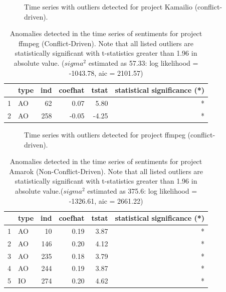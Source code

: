 \documentclass[12pt,letterpaper]{gthesis2}  %
\begin{document}
\begin{figure} [!htbp]
\centering
{}
\caption{Time series with outliers detected for project Kamailio (conflict-driven).}
\label{figureOutliers_1}
\end{figure}

\pagebreak

\begin{table} [!htbp]
\centering
\caption{Anomalies detected in the time series of sentiments for project ffmpeg (Conflict-Driven). Note that all listed outliers are statistically significant with t-statistics greater than 1.96 in absolute value. ($sigma^2$ estimated as 57.33:  log likelihood = -1043.78,  aic = 2101.57)}
\begin{tabular}{rlrrrr}
  \hline
 & type & ind & coefhat & tstat & statistical significance (*)\\ 
  \hline
1 & AO &  62 & 0.07 & 5.80 & * \\ 
  2 & AO & 258 & -0.05 & -4.25 & * \\ 
   \hline
\end{tabular}
\end{table}


\begin{figure} [!htbp]
\centering
{}
\caption{Time series with outliers detected for project ffmpeg (conflict-driven).}
\label{figureOutliers_2}
\end{figure}

\pagebreak


\begin{table} [!htbp]
\centering
\caption{Anomalies detected in the time series of sentiments for project Amarok (Non-Conflict-Driven). Note that all listed outliers are statistically significant with t-statistics greater than 1.96 in absolute value.($sigma^2$ estimated as 375.6:  log likelihood = -1326.61,  aic = 2661.22)}
\begin{tabular}{rlrrrr}
  \hline
 & type & ind & coefhat & tstat & statistical significance (*)\\ 
  \hline
1 & AO &  10 & 0.19 & 3.87 & * \\ 
  2 & AO & 146 & 0.20 & 4.12  & *\\ 
  3 & AO & 235 & 0.18 & 3.79 & * \\ 
  4 & AO & 244 & 0.19 & 3.87  & *\\ 
  5 & IO & 274 & 0.20 & 4.62  & *\\ 
   \hline
\end{tabular}
\end{table}
\end{document}
